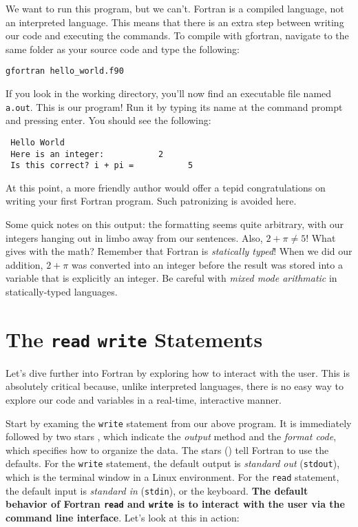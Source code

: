 \documentclass[11pt, letterpaper]{article}
\begin{document}
We want to run this program, but we can't.  Fortran is a compiled language,
not an interpreted language.  This means that there is an extra step between
writing our code and executing the commands.  To compile with gfortran,
navigate to the same folder as your source code and type the following:
\begin{verbatim}
gfortran hello_world.f90
\end{verbatim}

If you look in the working directory, you'll now find an executable file
named \texttt{a.out}.  This is our program!  Run it by typing its name at the
command prompt and pressing enter.  You should see the following:

\begin{verbatim}
 Hello World
 Here is an integer:           2
 Is this correct? i + pi =           5
\end{verbatim}


At this point, a more friendly author would offer a tepid congratulations on
writing your first Fortran program.  Such patronizing is avoided here.

Some quick notes on this output: the formatting seems quite arbitrary, with our
integers hanging out in limbo away from our sentences.  Also, $2+\pi \neq 5$!
What gives with the math?  Remember that Fortran is \emph{statically typed}!  When
we did our addition, $2+\pi$ was converted into an integer before the result was
stored into a variable that is explicitly an integer.  Be careful with
\emph{mixed mode arithmatic} in statically-typed languages.

\section{The \texttt{read} \texttt{write} Statements}

Let's dive further into Fortran by exploring how to interact with the user.
This is absolutely critical because, unlike interpreted languages, there is
no easy way to explore our code and variables in a real-time, interactive
manner.

Start by examing the \texttt{write} statement from our above program.
It is immediately followed by two stars {\tt *}, which indicate the \emph{output}
method and the \emph{format code}, which specifies how to organize the
data.  The stars ({\tt *}) tell Fortran to use the defaults.  For the {\tt write}
statement, the default output is \emph{standard out} ({\tt stdout}), which is
the terminal window in a Linux environment.  For the {\tt read} statement, the
default input is \emph{standard in} ({\tt stdin}), or the keyboard.
\textbf{The default behavior of Fortran {\tt read} and {\tt write} is to interact
  with the user via the command line interface}.  Let's look at this in action:
\end{document}
